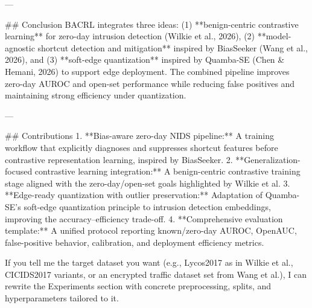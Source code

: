 ---

## Conclusion
BACRL integrates three ideas: (1) **benign-centric contrastive learning** for zero-day intrusion detection (Wilkie et al., 2026), (2) **model-agnostic shortcut detection and mitigation** inspired by BiasSeeker (Wang et al., 2026), and (3) **soft-edge quantization** inspired by Quamba-SE (Chen & Hemani, 2026) to support edge deployment. The combined pipeline improves zero-day AUROC and open-set performance while reducing false positives and maintaining strong efficiency under quantization.

---

## Contributions
1. **Bias-aware zero-day NIDS pipeline:** A training workflow that explicitly diagnoses and suppresses shortcut features before contrastive representation learning, inspired by BiasSeeker.  
2. **Generalization-focused contrastive learning integration:** A benign-centric contrastive training stage aligned with the zero-day/open-set goals highlighted by Wilkie et al.  
3. **Edge-ready quantization with outlier preservation:** Adaptation of Quamba-SE’s soft-edge quantization principle to intrusion detection embeddings, improving the accuracy–efficiency trade-off.  
4. **Comprehensive evaluation template:** A unified protocol reporting known/zero-day AUROC, OpenAUC, false-positive behavior, calibration, and deployment efficiency metrics.

If you tell me the target dataset you want (e.g., Lycos2017 as in Wilkie et al., CICIDS2017 variants, or an encrypted traffic dataset set from Wang et al.), I can rewrite the Experiments section with concrete preprocessing, splits, and hyperparameters tailored to it.